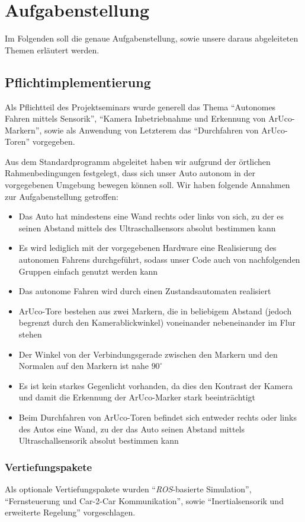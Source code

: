 \section{Aufgabenstellung}
\label{sec:aufgabenstellung}

Im Folgenden soll die genaue Aufgabenstellung, sowie unsere daraus abgeleiteten Themen erläutert werden.

\subsection{Pflichtimplementierung}
Als Pflichtteil des Projektseminars wurde generell das Thema "`Autonomes Fahren mittels Sensorik"', "`Kamera Inbetriebnahme und Erkennung von ArUco-Markern"', sowie als Anwendung von Letzterem das "`Durchfahren von ArUco-Toren"' vorgegeben.  

Aus dem Standardprogramm abgeleitet haben wir aufgrund der örtlichen Rahmenbedingungen festgelegt, dass sich unser Auto autonom in der vorgegebenen Umgebung bewegen können soll. 
Wir haben folgende Annahmen zur Aufgabenstellung getroffen:
\begin{itemize}
	\item Das Auto hat mindestens eine Wand rechts oder links von sich, zu der es seinen Abstand mittels des Ultraschallsensors absolut bestimmen kann
	\item Es wird lediglich mit der vorgegebenen Hardware eine Realisierung des autonomen Fahrens durchgeführt, sodass unser Code auch von nachfolgenden Gruppen einfach genutzt werden kann
	\item Das autonome Fahren wird durch einen Zustandsautomaten realisiert
	\item ArUco-Tore bestehen aus zwei Markern, die in beliebigem Abstand (jedoch begrenzt durch den Kamerablickwinkel) voneinander nebeneinander im Flur stehen
	\item Der Winkel von der Verbindungsgerade zwischen den Markern und den Normalen auf den Markern ist nahe $90^\circ$
	\item Es ist kein starkes Gegenlicht vorhanden, da dies den Kontrast der Kamera und damit die Erkennung der ArUco-Marker stark beeinträchtigt
	\item Beim Durchfahren von ArUco-Toren befindet sich entweder rechts oder links des Autos eine Wand, zu der das Auto seinen Abstand mittels Ultraschallsensorik absolut bestimmen kann
\end{itemize}

\subsubsection{Vertiefungspakete}
Als optionale Vertiefungspakete wurden "`\textit{ROS}-basierte Simulation"', "`Fernsteuerung und Car-2-Car Kommunikation"', sowie "`Inertialsensorik und erweiterte Regelung"' vorgeschlagen.


